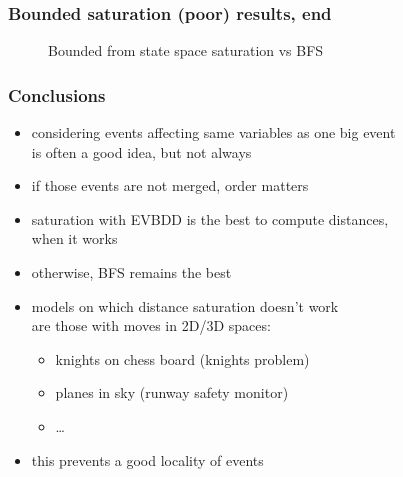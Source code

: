 \documentclass{beamer}
\begin{document}
\begin{frame}
  \frametitle{Bounded saturation (poor) results, end}

  \begin{center}
    \begin{figure}
      \caption{Bounded from state space saturation  vs BFS}
    \end{figure}
  \end{center}
\end{frame}

\begin{frame}
  \frametitle{Conclusions}

  \begin{itemize}
  \item considering events affecting same variables as one big event\\
    is often a good idea, but not always
  \item if those events are not merged, order matters
    \pause
  \item saturation with EVBDD is the best to compute distances,\\
    when it works
  \item otherwise, BFS remains the best
    \pause
  \item models on which distance saturation doesn't work\\
    are those with moves in 2D/3D spaces:
    \begin{itemize}
    \item knights on chess board (knights problem)
    \item planes in sky (runway safety monitor)
    \item \ldots
    \end{itemize}
  \item this prevents a good locality of events
  \end{itemize}
\end{frame}
\end{document}
